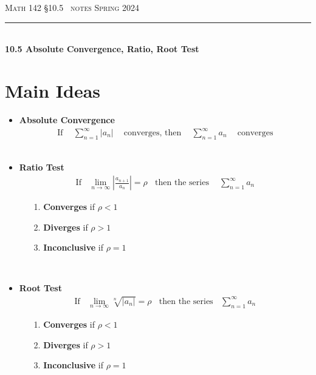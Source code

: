 \documentclass{article}
\def\chapt{10.5}
\begin{document}
\noindent
{\scshape Math 142} \hfill {\scshape \S\chapt~ notes} \hfill {\scshape Spring 2024}

\smallskip

\hrule

\bigskip

\hfill
\\

{
\huge
\noindent
\textbf{10.5 Absolute Convergence, Ratio, Root Test}
}

\section*{Main Ideas}

\begin{itemize}
\item
\textbf{Absolute Convergence}
\begin{gather*}
\text{If }
~~~~\sum_{n=1}^{\infty~} |a_n|
~~~~\text{ converges, then }~~~~
\sum_{n=1}^{\infty} a_n
~~~~\text{ converges}
\end{gather*}
\\

\item
\textbf{Ratio Test}
\begin{gather*}
\text{If}~~~~
\lim_{n \to \infty} \left| \frac{a_{n+1}}{a_n} \right| = \rho
~~~~\text{then the series }~~~~
\sum_{n=1}^{\infty} a_n
\end{gather*}
\begin{enumerate}
\item[1.]
\textbf{Converges} if $\rho<1$
\item[2.]
\textbf{Diverges} if $\rho>1$
\item[3.]
\textbf{Inconclusive} if $\rho=1$
\end{enumerate}
\hfill
\\

\item
\textbf{Root Test}
\begin{gather*}
\text{If}~~~~
\lim_{n\to \infty} \sqrt[n]{|a_n|} = \rho
~~~~\text{then the series}~~~~
\sum_{n=1}^{\infty} a_n
\end{gather*}
\begin{enumerate}
\item[1.]
\textbf{Converges} if $\rho<1$
\item[2.]
\textbf{Diverges} if $\rho>1$
\item[3.]
\textbf{Inconclusive} if $\rho=1$
\end{enumerate}
\hfill
\\

\end{itemize}
\end{document}
